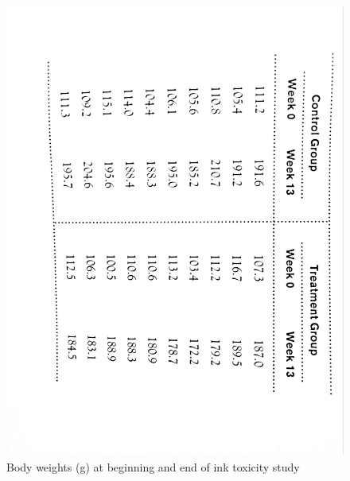 \documentclass[letterpaper,9pt,twoside,printwatermark=false]{pinp}
\begin{document}
\begin{figure}[h]
  \begin{center}
    \includegraphics[scale=0.55, angle=90]{a82-crop.pdf} 
  \end{center}
  \caption{Body weights (g) at beginning and end of ink toxicity study}\label{fig:tab3}
\end{figure}





\end{document}
